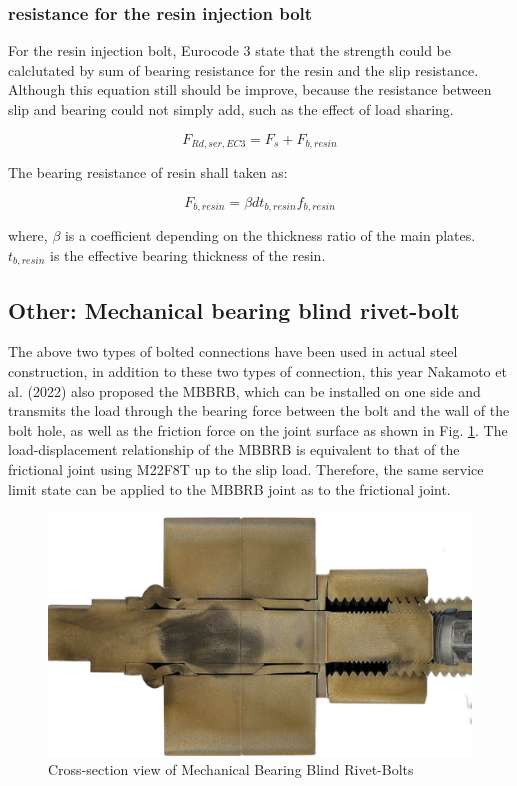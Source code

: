 \subsubsection{resistance for the resin injection bolt}

For the resin injection bolt, Eurocode 3 state that the strength could be calclutated by sum of 
bearing resistance for the resin and the slip resistance. Although this equation still should be improve, because the resistance between slip and bearing could not simply add, such as the effect of load sharing.


\begin{equation}
    F_{Rd,ser,EC3}=F_s+F_{b,resin}
\end{equation}   

The bearing resistance of resin shall taken as:

\begin{equation}
    F_{b,resin}=\beta dt_{b,resin}f_{b,resin}
\end{equation}

where, $\beta$ is a coefficient depending on the thickness ratio of the main plates. $t_{b,resin}$ is the effective bearing thickness of the resin. 


\subsection{Other: Mechanical bearing blind rivet-bolt}

The above two types of bolted connections have been used in actual steel construction, in addition to these two types of connection, this year Nakamoto et al. (2022) \cite{Nakamoto2022MBBRB} also proposed the \ac{MBBRB}, which can be installed on one side and transmits the load through the bearing force between the bolt and the wall of the bolt hole, as well as the friction force on the joint surface as shown in Fig. \ref{fig-MBBRB}. The load-displacement relationship of the \ac{MBBRB} is equivalent to that of the frictional joint using M22F8T up to the slip load. Therefore, the same service limit state can be applied to the MBBRB joint as to the frictional joint.


\begin{figure}[htbp]
    \centering
    \includegraphics[width=0.75\linewidth]{imgs//ch2/onesidebearingbolt.jpg}
    \caption{Cross-section view of Mechanical Bearing Blind Rivet-Bolts}
    \label{fig-MBBRB}
\end{figure}


